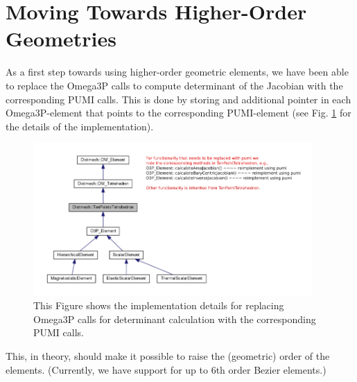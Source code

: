 \documentclass[review,authoryear,12pt]{elsarticle_summary_report}
\begin{document}
\section{Moving Towards Higher-Order Geometries}
As a first step towards using higher-order geometric elements, we have been able to replace the Omega3P calls to compute determinant of the Jacobian with the corresponding PUMI calls. This is done by storing and additional pointer in each Omega3P-element that points to the corresponding  PUMI-element (see Fig. \ref{imp} for the details of the implementation). 
\begin{figure}[ph!]
\centering
\includegraphics[width=0.95\textwidth]{hide_ten_point_tet.png}
\caption{\label{imp} This Figure shows the implementation details for replacing Omega3P calls for determinant calculation with the corresponding PUMI calls.}
\end{figure}
This, in theory, should make it possible to raise the (geometric) order of the elements. (Currently, we have support for up to 6th order Bezier elements.)

% 
%  

\newpage 

\end{document}
